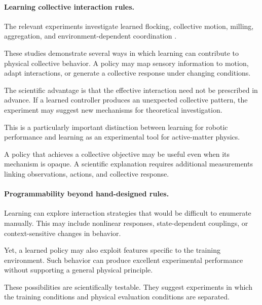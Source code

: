 \paragraph*{Learning collective interaction rules.}

The relevant experiments investigate
learned flocking, collective motion,
milling, aggregation, and
environment-dependent coordination
\cite{Schilling2019learningvisionbase,Choi2026communicationfreec,Kraus2026generativeadversari,Wu2024adversarialimitatio,Lffler2023collectiveforaging,Liu2025collectivemotionmo,An2026ondemandpatterntr,Zhang2025learningefficientf,Zhu2025amillingswarmofg,Zhu2025fromspikestoswarm,Jia2025adeepreinforcement}.

These studies demonstrate several ways
in which learning can contribute
to physical collective behavior.
A policy may map sensory information
to motion, adapt interactions,
or generate a collective response
under changing conditions.

The scientific advantage is that
the effective interaction need
not be prescribed in advance.
If a learned controller
produces an unexpected
collective pattern, the
experiment may suggest
new mechanisms for
theoretical investigation.

This is a particularly
important distinction
between learning for
robotic performance
and learning as an
experimental tool
for active-matter physics.

A policy that achieves
a collective objective
may be useful even when
its mechanism is opaque.
A scientific explanation
requires additional
measurements linking
observations, actions,
and collective response.

\paragraph*{Programmability beyond hand-designed rules.}

Learning can explore interaction
strategies that would be
difficult to enumerate
manually. This may
include nonlinear responses,
state-dependent couplings,
or context-sensitive
changes in behavior.

Yet, a learned policy
may also exploit
features specific
to the training
environment.
Such behavior
can produce excellent
experimental performance
without supporting
a general physical
principle.

These possibilities
are scientifically
testable. They
suggest experiments
in which the
training conditions
and physical
evaluation conditions
are separated.

